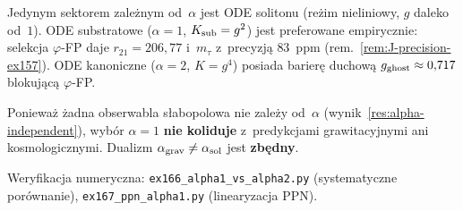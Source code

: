 \begin{corollary}[$\alpha = 1$ preferowane bez konfliktu]%
\label{cor:alpha1-preferred}
Jedynym sektorem zale\.znym od~$\alpha$ jest ODE solitonu
(re\.zim nieliniowy, $g$ daleko od~$1$).
ODE substratowe ($\alpha = 1$, $K_{\rm sub} = g^2$) jest preferowane
empirycznie: selekcja $\varphi$-FP daje $r_{21} = 206{,}77$
i~$m_\tau$ z~precyzj\k{a} $83$~ppm (rem.~\ref{rem:J-precision-ex157}).
ODE kanoniczne ($\alpha = 2$, $K = g^4$) posiada barier\k{e}
duchow\k{a} $g_{\rm ghost} \approx 0{,}717$
blokuj\k{a}c\k{a} $\varphi$-FP.

Poniewa\.z \.zadna obserwabla s\l{}abopolowa nie zale\.zy od~$\alpha$
(wynik~\ref{res:alpha-independent}), wyb\'or $\alpha = 1$
\textbf{nie koliduje} z~predykcjami grawitacyjnymi ani kosmologicznymi.
Dualizm $\alpha_{\rm grav} \neq \alpha_{\rm sol}$ jest
\textbf{zb\k{e}dny}.
\end{corollary}

\noindent
Weryfikacja numeryczna: \texttt{ex166\_alpha1\_vs\_alpha2.py}
(systematyczne por\'ownanie),
\texttt{ex167\_ppn\_alpha1.py} (linearyzacja PPN).

